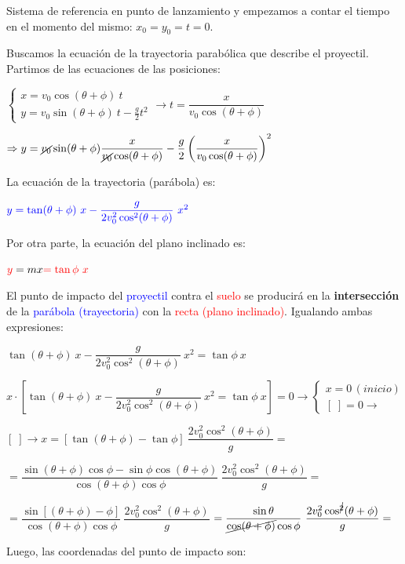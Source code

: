 Sistema de referencia en punto de lanzamiento y empezamos a contar el tiempo en el momento del mismo: $x_0=y_0=t=0$.

Buscamos la ecuación de la trayectoria parabólica que describe el proyectil. Partimos de las ecuaciones de las posiciones:

$\begin{cases} x=v_0 \cos (\theta+\phi) \ t \\ y=v_0 \sin (\theta+\phi) \ t - \frac g 2 t^2 \end{cases}  \to t=\dfrac x{v_0 \cos (\theta+\phi)} $

$\Rightarrow y=\cancel{v_0} \sin (\theta+\phi) \dfrac x{\cancel{v_0} \cos (\theta+\phi)} - \dfrac g 2 \left( \dfrac x{v_0 \cos (\theta+\phi)}  \right)^2$

La ecuación de la trayectoria (parábola) es:

$\textcolor{blue}{y=\tan(\theta+\phi) \ x - \dfrac {g}{2 v_0^2 \cos^2 (\theta+\phi)}\ x^2}$

Por otra parte, la ecuación del plano inclinado es:

$\textcolor{red}{y}=mx\textcolor{red}{=\tan \phi \ x}$

El punto de impacto del \textcolor{blue}{proyectil} contra el \textcolor{red}{suelo} se producirá en la \textbf{intersección} de la \textcolor{blue}{parábola (trayectoria)} con la \textcolor{red}{recta (plano inclinado)}. Igualando ambas expresiones:

$\tan(\theta+\phi) \ x - \dfrac {g}{2 v_0^2 \cos^2 (\theta+\phi)}\ x^2=\tan \phi \ x$

$x\cdot \left[ 
\tan(\theta+\phi) \ x - \dfrac {g}{2 v_0^2 \cos^2 (\theta+\phi)}\ x^2=\tan \phi \ x
 \right]=0 \to  \begin{cases} x=0 \,(inicio) \\ [ \; ]=0 \to \end{cases}$


$[\;]\to x=\left[\tan (\theta+\phi)-\tan \phi  \right] \  \dfrac{2v_0^2 \cos^2(\theta+\phi)}{g} =$

$=\dfrac {\sin(\theta+\phi) \cos \phi-\sin \phi \cos(\theta+\phi)}{\cos(\theta+\phi) \cos \phi} \  \dfrac{2v_0^2 \cos^2(\theta+\phi)}{g} =$

$=\dfrac {\sin [(\theta+\phi)-\phi]}{\cos(\theta+\phi) \cos \phi} \ \dfrac{2v_0^2 \cos^2(\theta+\phi)}{g} $
$=\dfrac {\sin \theta}{\cancel{\cos(\theta+\phi)} \cos \phi} \ \dfrac{2v_0^2 \cos^{\cancel{2}}(\theta+\phi)}{g} =$


Luego, las coordenadas del punto de impacto son:

